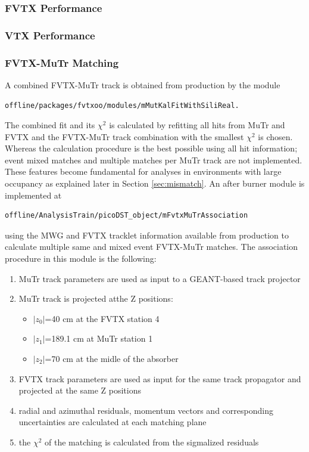 \documentclass[12pt]{article}
\begin{document}
\subsubsection{FVTX Performance}

\subsubsection{VTX Performance}


\subsubsection{FVTX-MuTr Matching}
\label{sec:matching}

A combined FVTX-MuTr track is obtained from production by the module

\begin{verbatim}
offline/packages/fvtxoo/modules/mMutKalFitWithSiliReal.
\end{verbatim}

The combined fit and its $\chi^2$ is calculated by refitting all hits from MuTr and FVTX and the FVTX-MuTr track combination with the smallest $\chi^2$ is chosen. Whereas the calculation 
procedure is the best possible using all hit information; event mixed matches and multiple matches per MuTr track are not implemented. These features become fundamental for analyses in 
environments with large occupancy as explained later in Section \ref{sec:mismatch}. An after burner module is implemented at

\begin{verbatim}
offline/AnalysisTrain/picoDST_object/mFvtxMuTrAssociation
\end{verbatim}

\noindent using the MWG and FVTX tracklet information available from production to calculate multiple same and mixed event FVTX-MuTr matches. 
The association procedure in this module is the following:

\begin{enumerate}
	\item MuTr track parameters are used as input to a GEANT-based track projector
	\item MuTr track is projected atthe Z positions:
	\begin{itemize}	
		\item $|z_0|$=40 cm at the FVTX station 4
		\item $|z_1|$=189.1 cm at MuTr station 1
		\item $|z_2|$=70 cm at the midle of the absorber
	\end{itemize}
	\item FVTX track parameters are used as input for the same track propagator and projected at the same Z positions
	\item radial and azimuthal residuals, momentum vectors and corresponding uncertainties are calculated at each matching plane
	\item the $\chi^2$ of the matching is calculated from the sigmalized residuals
\end{enumerate}
\end{document}
